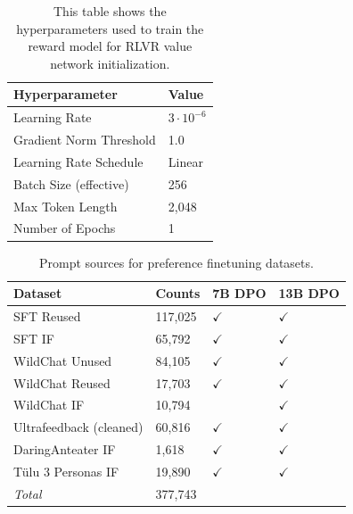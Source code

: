 \documentclass[table]{ai2style/ai2}
\begin{document}
\begin{table}[h!]
\centering
\begin{tabular}{@{}ll@{}}
\toprule
\textbf{Hyperparameter} & \textbf{Value} \\
\midrule
Learning Rate & $3 \cdot 10^{-6}$ \\
Gradient Norm Threshold & 1.0 \\
Learning Rate Schedule & Linear \\
Batch Size (effective) & 256 \\
Max Token Length &2,048 \\
Number of Epochs & 1 \\
\bottomrule
\end{tabular}
\vspace{3pt}
\caption{This table shows the hyperparameters used to train the reward model for RLVR value network initialization.}
\label{tab:rm-hypers}
\end{table}

\begin{table}[h!]
    \centering
    \begin{tabular}{llll}
    \toprule
    \textbf{Dataset} & \textbf{Counts} & \textbf{7B DPO} & \textbf{13B DPO} \\
    \midrule
       SFT Reused  & 117,025 & $\checkmark$ & $\checkmark$   \\
       SFT IF & 65,792 & $\checkmark$ & $\checkmark$  \\
       WildChat Unused & 84,105 & $\checkmark$ & $\checkmark$ \\
       WildChat Reused & 17,703 &  $\checkmark$ & $\checkmark$ \\
       WildChat IF & 10,794 &  & $\checkmark$ \\
       Ultrafeedback (cleaned) & 60,816 & $\checkmark$ & $\checkmark$ \\
       DaringAnteater IF & 1,618 & $\checkmark$ & $\checkmark$ \\
       T\"ulu 3 Personas IF & 19,890 & $\checkmark$ & $\checkmark$ \\
       \midrule
       \textit{Total} & 377,743 & & \\
    \bottomrule
    \end{tabular}
    \caption{Prompt sources for preference finetuning datasets.}
    \label{tab:prompt_sources}
\end{table}
\end{document}
